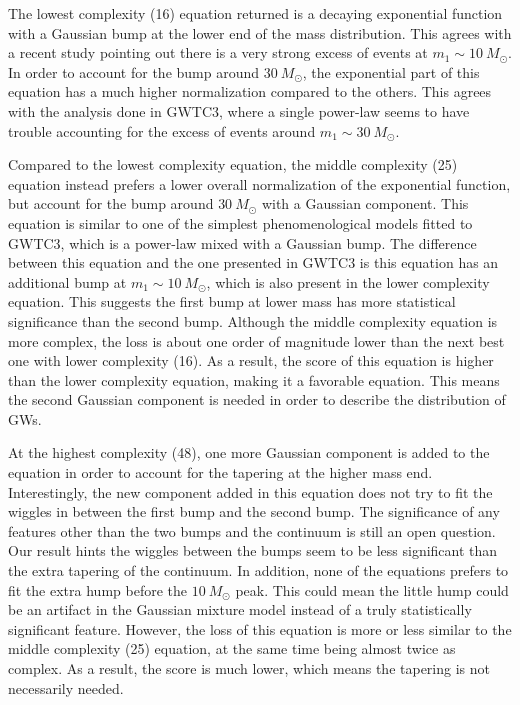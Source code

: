 \documentclass[nohyperref]{article}
\theoremstyle{plain}
\theoremstyle{definition}
\theoremstyle{remark}
\begin{document}
The lowest complexity (16) equation returned is a decaying exponential function with a Gaussian bump at the lower end of the mass distribution.
This agrees with a recent study pointing out there is a very strong excess of events at $m_{1}\sim 10\ M_{\odot}$.
In order to account for the bump around $30\ M_{\odot}$,
the exponential part of this equation has a much higher normalization compared to the others.
This agrees with the analysis done in GWTC3, where a single power-law seems to have trouble accounting for the excess of events around $m_{1}\sim 30\ M_{\odot}$\cite{LIGOScientific:2021psn}.

Compared to the lowest complexity equation, the middle complexity (25) equation instead prefers a lower overall normalization of the exponential function,
but account for the bump around $30\ M_{\odot}$ with a Gaussian component.
This equation is similar to one of the simplest phenomenological models fitted to GWTC3, which is a power-law mixed with a Gaussian bump.
The difference between this equation and the one presented in GWTC3 is this equation has an additional bump at $m_{1}\sim 10\ M_{\odot}$,
which is also present in the lower complexity equation.
This suggests the first bump at lower mass has more statistical significance than the second bump.
Although the middle complexity equation is more complex, the loss is about one order of magnitude lower than the next best one with lower complexity (16).
As a result, the score of this equation is higher than the lower complexity equation, making it a favorable equation. This means the second Gaussian component is needed in order to describe the distribution of GWs.

At the highest complexity (48), one more Gaussian component is added to the equation in order to account for the tapering at the higher mass end. 
Interestingly, the new component added in this equation does not try to fit the wiggles in between the first bump and the second bump.
The significance of any features other than the two bumps and the continuum is still an open question.
Our result hints the wiggles between the bumps seem to be less significant than the extra tapering of the continuum.
In addition, none of the equations prefers to fit the extra hump before the $10\ M_{\odot}$ peak.
This could mean the little hump could be an artifact in the Gaussian mixture model instead of a truly statistically significant feature.
However, the loss of this equation is more or less similar to the middle complexity (25) equation, at the same time being almost twice as complex. As a result, the score is much lower, which means the tapering is not necessarily needed.
\end{document}
